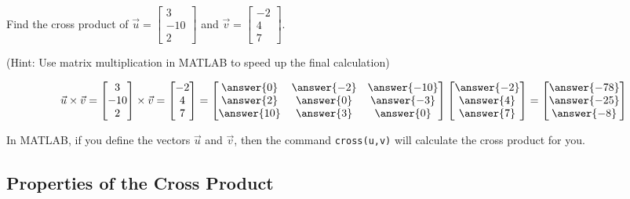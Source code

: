 \documentclass{ximera}
\begin{document}
 
\begin{example}\label{ex:crossproduct}
Find the cross product of $\vec{u}=\begin{bmatrix}3\\ -10\\ 2\end{bmatrix}$ and $\vec{v}=\begin{bmatrix}-2\\ 4\\ 7\end{bmatrix}$.

\begin{solution}

  (Hint: Use matrix multiplication in MATLAB to speed up the final calculation)

$$\vec{u}\times \vec{v}=\begin{bmatrix}3\\ -10\\ 2\end{bmatrix}\times\vec{v}=\begin{bmatrix}-2\\ 4\\ 7\end{bmatrix}=\begin{bmatrix}\answer{0} & \answer{-2} & \answer{-10} \\
\answer{2} & \answer{0} & \answer{-3} \\
\answer{10} & \answer{3} & \answer{0}
\end{bmatrix}
\begin{bmatrix}
\answer{-2} \\ \answer{4} \\ \answer{7}
\end{bmatrix}
=
\begin{bmatrix}
\answer{-78} \\ \answer{-25} \\ \answer{-8}
\end{bmatrix}$$

\end{solution}
\end{example}

In MATLAB, if you define the vectors $\vec{u}$ and $\vec{v}$, then the command \texttt{cross(u,v)} will calculate the cross product for you.
 
\subsection*{Properties of the Cross Product}
 
\end{document}
